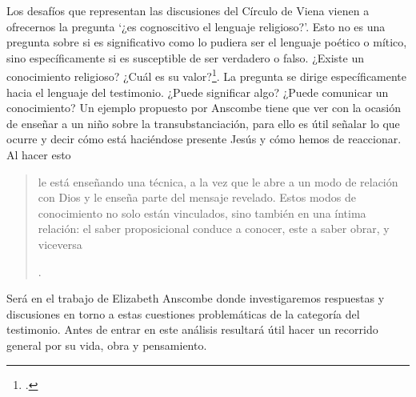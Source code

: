 Los desafíos que representan las discusiones del Círculo de Viena vienen a ofrecernos la pregunta \enquote*{¿es cognoscitivo el lenguaje religioso?}. Esto no es una pregunta sobre si es significativo como lo pudiera ser el lenguaje poético o mítico, sino específicamente si es susceptible de ser verdadero o falso. ¿Existe un conocimiento religioso? ¿Cuál es su valor?\footcite[Cf.][23]{conesa1994cc}. La pregunta se dirige específicamente hacia el lenguaje del testimonio. ¿Puede significar algo? ¿Puede comunicar un conocimiento? Un ejemplo propuesto por Anscombe tiene que ver con la ocasión de enseñar a un niño sobre la transubstanciación, para ello es útil señalar lo que ocurre y decir cómo está haciéndose presente Jesús y cómo hemos de reaccionar. Al hacer esto \blockquote[{\Cite[21]{conesa1994cc}}.]{le está enseñando una técnica, a la vez que le abre a un modo de relación con Dios y le enseña parte del mensaje revelado. Estos modos de conocimiento no solo están vinculados, sino también en una íntima relación: el saber proposicional conduce a conocer, este a saber obrar, y viceversa}.

Será en el trabajo de Elizabeth Anscombe donde investigaremos respuestas y discusiones en torno a estas cuestiones problemáticas de la categoría del testimonio. Antes de entrar en este análisis resultará útil hacer un recorrido general por su vida, obra y pensamiento.
